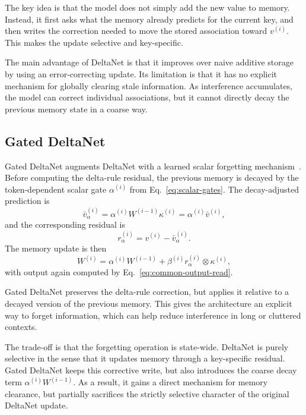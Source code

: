 \documentclass{article}
\begin{document}
The key idea is that the model does not simply add the new value to memory. Instead, it first asks what the memory already predicts for the current key, and then writes the correction needed to move the stored association toward $v^{(i)}$. This makes the update selective and key-specific.

The main advantage of DeltaNet is that it improves over naive additive storage by using an error-correcting update. Its limitation is that it has no explicit mechanism for globally clearing stale information. As interference accumulates, the model can correct individual associations, but it cannot directly decay the previous memory state in a coarse way.

\subsection{Gated DeltaNet}

Gated DeltaNet augments DeltaNet with a learned scalar forgetting mechanism~\cite{yang2024gdn}. Before computing the delta-rule residual, the previous memory is decayed by the token-dependent scalar gate $\alpha^{(i)}$ from Eq.~\eqref{eq:scalar-gates}. The decay-adjusted prediction is
\begin{equation}
\bar v_{\alpha}^{(i)}
=
\alpha^{(i)}
W^{(i-1)}
\kappa^{(i)}
=
\alpha^{(i)}
\bar v^{(i)},
\end{equation}
and the corresponding residual is
\begin{equation}
r_{\alpha}^{(i)}
=
v^{(i)}
-
\bar v_{\alpha}^{(i)}.
\end{equation}
The memory update is then
\begin{equation}
W^{(i)}
=
\alpha^{(i)} W^{(i-1)}
+
\beta^{(i)}
r_{\alpha}^{(i)}
\otimes
\kappa^{(i)},
\end{equation}
with output again computed by Eq.~\eqref{eq:common-output-read}.

Gated DeltaNet preserves the delta-rule correction, but applies it relative to a decayed version of the previous memory. This gives the architecture an explicit way to forget information, which can help reduce interference in long or cluttered contexts.

The trade-off is that the forgetting operation is state-wide. DeltaNet is purely selective in the sense that it updates memory through a key-specific residual. Gated DeltaNet keeps this corrective write, but also introduces the coarse decay term $\alpha^{(i)} W^{(i-1)}$. As a result, it gains a direct mechanism for memory clearance, but partially sacrifices the strictly selective character of the original DeltaNet update.
\end{document}
